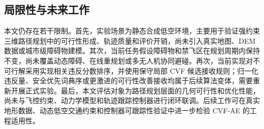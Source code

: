\subsection{局限性与未来工作}
\label{sec:limitations}

本文仍存在若干限制。首先，实验场景为静态合成低空环境，主要用于验证强约束三维路径规划中的可行性形成、轨迹质量和评价开销，尚未引入真实地图、DEM 数据或城市级障碍物建模。其次，当前任务假设障碍物和禁飞区在规划周期内保持不变，尚未覆盖动态障碍、在线重规划或多无人机协同避碰。再次，当前实现对不可行解采用实现相关违反分数排序，并使用保守局部 CVF 候选接收规则；归一化违反量、安全优先词典序或更激进的可行性改善接收均属于后续算法变体，需要重新开展正式实验。最后，本文评估对象为路径规划层面的几何可行性和优化性能，尚未与飞控约束、动力学模型和轨迹跟踪控制器进行闭环联调。后续工作可在真实地形数据、动态低空交通约束和控制器可跟踪性验证中进一步检验 CVF-AE 的工程适用性。
